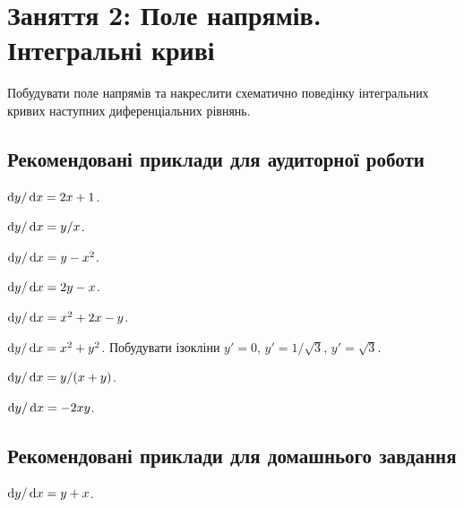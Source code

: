 \section*{Заняття 2: Поле напрямів. Інтегральні криві}

Побудувати поле напрямів та накреслити схематично поведінку інтегральних кривих наступних диференціальних рівнянь.

\subsection*{Рекомендовані приклади для аудиторної роботи}

\begin{problem}
	$\mathop{}\!\mathrm{d} y / \mathop{}\!\mathrm{d} x = 2 x + 1$.
\end{problem}

\begin{problem}
	$\mathop{}\!\mathrm{d} y / \mathop{}\!\mathrm{d} x = y / x$.
\end{problem}

\begin{problem}
	$\mathop{}\!\mathrm{d} y / \mathop{}\!\mathrm{d} x = y - x^2$.
\end{problem}

\begin{problem}
	$\mathop{}\!\mathrm{d} y / \mathop{}\!\mathrm{d} x = 2 y - x$.
\end{problem}

\begin{problem}
	$\mathop{}\!\mathrm{d} y / \mathop{}\!\mathrm{d} x = x^2 + 2 x - y$.
\end{problem}

\begin{problem}
	$\mathop{}\!\mathrm{d} y / \mathop{}\!\mathrm{d} x = x^2 + y^2$. Побудувати ізокліни $y' = 0$, $y' = 1 / \sqrt{3}$, $y' = \sqrt{3}$.
\end{problem}

\begin{problem}
	$\mathop{}\!\mathrm{d} y / \mathop{}\!\mathrm{d} x = y / (x + y)$.
\end{problem}

\begin{problem}
	$\mathop{}\!\mathrm{d} y / \mathop{}\!\mathrm{d} x = - 2 x y$.
\end{problem}

\subsection*{Рекомендовані приклади для домашнього завдання}

\begin{problem}
	$\mathop{}\!\mathrm{d} y / \mathop{}\!\mathrm{d} x = y + x$.
\end{problem}

